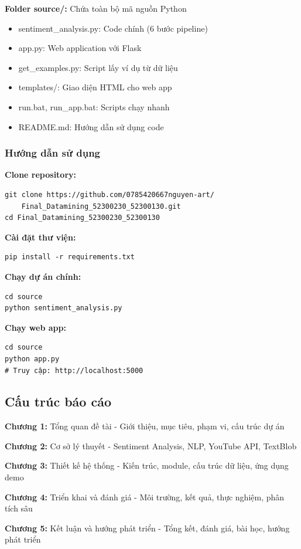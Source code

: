 \textbf{Folder source/:} Chứa toàn bộ mã nguồn Python
\begin{itemize}
    \item sentiment\_analysis.py: Code chính (6 bước pipeline)
    \item app.py: Web application với Flask
    \item get\_examples.py: Script lấy ví dụ từ dữ liệu
    \item templates/: Giao diện HTML cho web app
    \item run.bat, run\_app.bat: Scripts chạy nhanh
    \item README.md: Hướng dẫn sử dụng code
\end{itemize}

\subsubsection{Hướng dẫn sử dụng}
\textbf{Clone repository:}
\begin{verbatim}
git clone https://github.com/0785420667nguyen-art/
    Final_Datamining_52300230_52300130.git
cd Final_Datamining_52300230_52300130
\end{verbatim}

\textbf{Cài đặt thư viện:}
\begin{verbatim}
pip install -r requirements.txt
\end{verbatim}

\textbf{Chạy dự án chính:}
\begin{verbatim}
cd source
python sentiment_analysis.py
\end{verbatim}

\textbf{Chạy web app:}
\begin{verbatim}
cd source
python app.py
# Truy cập: http://localhost:5000
\end{verbatim}

\subsection{Cấu trúc báo cáo}
\textbf{Chương 1:} Tổng quan đề tài - Giới thiệu, mục tiêu, phạm vi, cấu trúc dự án

\textbf{Chương 2:} Cơ sở lý thuyết - Sentiment Analysis, NLP, YouTube API, TextBlob

\textbf{Chương 3:} Thiết kế hệ thống - Kiến trúc, module, cấu trúc dữ liệu, ứng dụng demo

\textbf{Chương 4:} Triển khai và đánh giá - Môi trường, kết quả, thực nghiệm, phân tích sâu

\textbf{Chương 5:} Kết luận và hướng phát triển - Tổng kết, đánh giá, bài học, hướng phát triển
